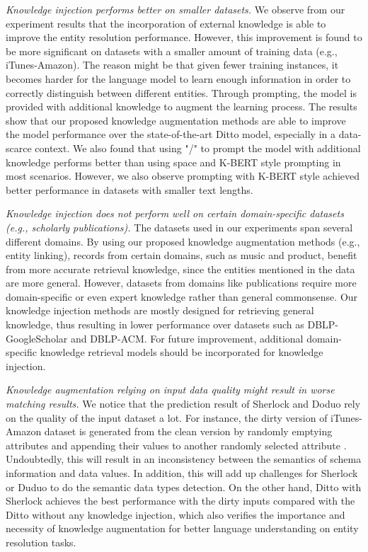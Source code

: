 \textit{Knowledge injection performs better on smaller datasets.}
We observe from our experiment results that the incorporation of external knowledge is able to improve the entity resolution performance. However, this improvement is found to be more significant on datasets with a smaller amount of training data (e.g., iTunes-Amazon). The reason might be that given fewer training instances, it becomes harder for the language model to learn enough information in order to correctly distinguish between different entities. 
Through prompting, the model is provided with additional knowledge to augment the learning process. The results show that our proposed knowledge augmentation methods are able to improve the model performance over the state-of-the-art Ditto model, especially in a data-scarce context.
We also found that using "/" to prompt the model with additional knowledge performs better than using space and K-BERT style prompting in most scenarios. However, we also observe prompting with K-BERT style achieved better performance in datasets with smaller text lengths. 

\textit{Knowledge injection does not perform well on certain domain-specific datasets (e.g., scholarly publications).}
The datasets used in our experiments span several different domains. By using our proposed knowledge augmentation methods (e.g., entity linking), records from certain domains, such as music and product, benefit from more accurate retrieval knowledge, since the entities mentioned in the data are more general. 
However, datasets from domains like publications require more domain-specific or even expert knowledge rather than general commonsense. Our knowledge injection methods are mostly designed for retrieving general knowledge, thus resulting in lower performance over datasets such as DBLP-GoogleScholar and DBLP-ACM. For future improvement, additional domain-specific knowledge retrieval models should be incorporated for knowledge injection. 

\textit{Knowledge augmentation relying on input data quality might result in worse matching results.}
We notice that the prediction result of Sherlock and Doduo rely on the quality of the input dataset a lot. For instance, the dirty version of iTunes-Amazon dataset is generated from the clean version by randomly emptying attributes and appending their values to another randomly selected
attribute \cite{li_deep_2020}. Undoubtedly, this will result in an inconsistency between the semantics of schema information and data values. In addition, this will add up challenges for Sherlock or Duduo to do the semantic data types detection. On the other hand, Ditto with Sherlock achieves the best performance with the dirty inputs compared with the Ditto without any knowledge injection, which also verifies the importance and necessity of knowledge augmentation for better language understanding on entity resolution tasks.


